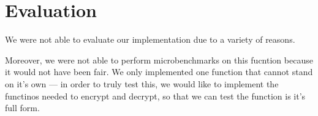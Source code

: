 \section{Evaluation}
\label{sec:evaluation}
We were not able to evaluate our implementation due to a variety of reasons.

\cite{almeida2016}

Moreover, we were not able to perform microbenchmarks on this fucntion because
it would not have been fair. We only implemented one function that cannot stand
on it's own --- in order to truly test this, we would like to implement the
functinos needed to encrypt and decrypt, so that we can test the function is
it's full form.

